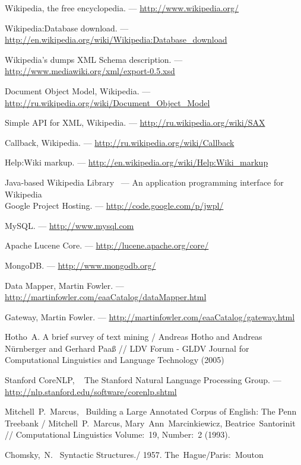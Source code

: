 Wikipedia, the free encyclopedia. --- \url{http://www.wikipedia.org/}

Wikipedia:Database download. --- \url{http://en.wikipedia.org/wiki/Wikipedia:Database_download}

Wikipedia's dumps XML Schema description. --- \url{http://www.mediawiki.org/xml/export-0.5.xsd}

Document Object Model, Wikipedia. --- \url{http://ru.wikipedia.org/wiki/Document_Object_Model}

Simple API for XML, Wikipedia. --- \url{http://ru.wikipedia.org/wiki/SAX}

Callback, Wikipedia. --- \url{http://ru.wikipedia.org/wiki/Callback}

Help:Wiki markup. --- \url{http://en.wikipedia.org/wiki/Help:Wiki_markup}

Java-based Wikipedia Library~
--- An application programming interface for Wikipedia \\
Google Project Hosting. --- \url{http://code.google.com/p/jwpl/}

MySQL. --- \url{http://www.mysql.com}

Apache Lucene Core. --- \url{http://lucene.apache.org/core/}

MongoDB. --- \url{http://www.mongodb.org/}

Data Mapper, Martin Fowler. --- \url{http://martinfowler.com/eaaCatalog/dataMapper.html}

Gateway, Martin Fowler. --- \url{http://martinfowler.com/eaaCatalog/gateway.html}

Hotho~A.
A brief survey of text mining /
Andreas Hotho and Andreas Nürnberger and Gerhard Paaß //
LDV Forum - GLDV Journal for Computational Linguistics and Language Technology (2005)

Stanford CoreNLP, ~
The Stanford Natural Language Processing Group. ---
\url{http://nlp.stanford.edu/software/corenlp.shtml}

Mitchell~P.~Marcus,~
Building a Large Annotated Corpus of English: The Penn Treebank /
Mitchell~P.~Marcus, Mary~Ann~Marcinkiewicz, Beatrice~Santorinit // 
Computational Linguistics 
Volume:~19, Number:~2 (1993).

Chomsky,~N.~
Syntactic Structures./
1957. The~Hague/Paris:~Mouton

